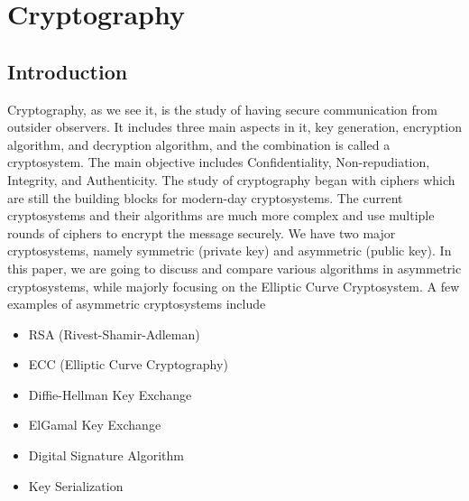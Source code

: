\chapter{Cryptography}\label{chap:ecc_comparsions}

\section{Introduction}
Cryptography, as we see it, is the study of having secure communication from outsider observers.
It includes three main aspects in it, key generation, encryption algorithm, and decryption algorithm, and the combination is called a cryptosystem.
The main objective includes Confidentiality, Non-repudiation, Integrity, and Authenticity. 
The study of cryptography began with ciphers which are still the building blocks for modern-day cryptosystems.
The current cryptosystems and their algorithms are much more complex and use multiple rounds of ciphers to encrypt the message securely. 
We have two major cryptosystems, namely symmetric (private key) and asymmetric (public key).
In this paper, we are going to discuss and compare various algorithms in asymmetric cryptosystems, while majorly focusing on the Elliptic Curve Cryptosystem. A few examples of asymmetric cryptosystems include

\begin{itemize}
    \itemsep0em
    \item RSA (Rivest-Shamir-Adleman)
    \item ECC (Elliptic Curve Cryptography)
    \item Diffie-Hellman Key Exchange
    \item ElGamal Key Exchange
    \item Digital Signature Algorithm
    \item Key Serialization
\end{itemize}

